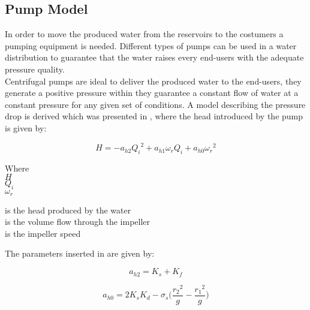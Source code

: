 \subsection{Pump Model} 
\label{PumpModel}
In order to move the produced water from the reservoirs to the costumers a 
pumping equipment is needed.  Different types of pumps can be used in a water distribution to 
guarantee that the water raises every end-users with the adequate pressure 
quality.\\
Centrifugal pumps are ideal to deliver the produced water to the end-users, they 
generate a positive pressure within they guarantee a constant flow of water at a 
constant pressure for any given set of conditions. 
A model describing the pressure drop is derived which was presented in 
\cite{Phd_Carsten}, where the head introduced by the pump is given by:

\begin{equation}
  H = -a_{h2}{Q_i}^2 + a_{h1} \omega_r Q_i + a_{h0}{\omega_r}^2
  \label{PumpModel}
\end{equation}

\begin{minipage}[t]{0.20\textwidth}
Where\\
\hspace*{8mm} $H$ \\
\hspace*{8mm} $Q_i$ \\
\hspace*{8mm} $\omega_r$ 

\end{minipage}
\begin{minipage}[t]{0.68\textwidth}
\vspace*{2mm}
is the head produced by the water\\
is the volume flow through the impeller\\
is the impeller speed
\end{minipage}

The parameters inserted in  are given by:

\begin{minipage}[t]{0.20\textwidth}
\begin{equation*}
  a_{h2} = K_s + K_f
\end{equation*}
\end{minipage}
\begin{minipage}[t]{0.68\textwidth}
\begin{equation*}
  a_{h0} = 2K_sK_d - \sigma_s 
  \bigg(\frac{{r_2}^2}{g}-\frac{{r_1}^2}{g}\bigg)
\end{equation*}
\end{minipage}

